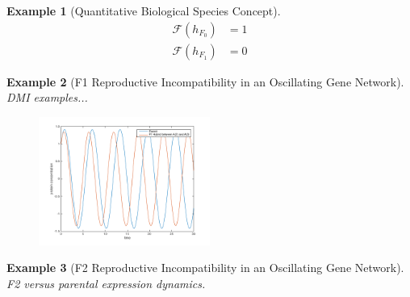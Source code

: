 \documentclass[9 pt]{article}
\newcommand{\1}{\mathbbm{1}}
\newtheorem{example}{Example}
\begin{document}
\begin{multicols}{2}
\begin{example}[Quantitative Biological Species Concept]
        \begin{align*}
          \mathcal{F} \left(h_{F_{0}}\right) &= 1 \\
          \mathcal{F}\left(h_{F_{1}}\right) &= 0
        \end{align*}
      \end{example}
      
      \begin{example}[F1 Reproductive Incompatibility in an Oscillating Gene Network]
        DMI examples...
        \begin{figure}[H]
          \includegraphics[width=0.5\textwidth]{A2_A3_osci_F1_hyb}
        \end{figure}
      \end{example}

      \begin{example}[F2 Reproductive Incompatibility in an Oscillating Gene Network]
        F2 versus parental expression dynamics. 


\end{example}
\end{multicols}
\end{document}
